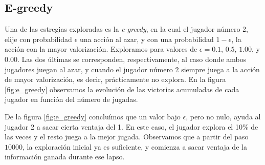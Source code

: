 \documentclass[11pt, spanish]{article}
\begin{document}
\subsection{E-greedy}
\par Una de las estregias exploradas es la \emph{e-greedy}, en la cual el jugador número 2, elije con probabilidad $\epsilon$ una acción al azar, y con una probabilidad $1-\epsilon$, la acción con la mayor valorización. Exploramos para valores de $\epsilon = 0.1$, $0.5$, $1.00$, y $0.00$. Las dos últimas se corresponden, respectivamente, al caso donde ambos jugadores juegan al azar, y cuando el jugador número 2 siempre juega a la acción de mayor valorización, es decir, prácticamente no explora. En la figura \ref{fig:e_greedy} observamos la evolución de las victorias acumuladas de cada jugador en función del número de jugadas.
\par De la figura \ref{fig:e_greedy} concluímos que un valor bajo $\epsilon$, pero no nulo, ayuda al jugador 2 a sacar cierta ventaja del 1. En este caso, el jugador explora el 10\% de las veces y el resto juega a la mejor jugada. Observamos que a partir del paso $10000$, la exploración inicial ya es suficiente, y comienza a sacar ventaja de la información ganada durante ese lapso. 
\end{document}
